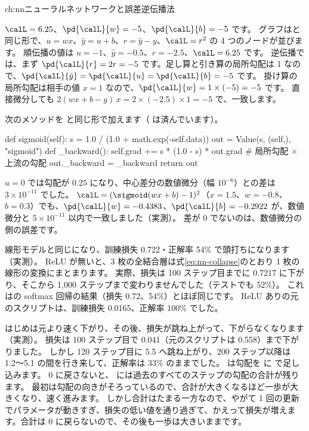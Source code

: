 \begin{answers}{ch:nn}{ニューラルネットワークと誤差逆伝播法}
\item $\calL=6.25$、$\pd{\calL}{w}=-5$、$\pd{\calL}{b}=-5$ です。
グラフはと同じ形で、$u=wx$、$\hat y=u+b$、$r=\hat y-y$、$\calL=r^2$ の 4 つのノードが並びます。
順伝播の値は $u=-1$、$\hat y=-0.5$、$r=-2.5$、$\calL=6.25$ です。
逆伝播では、まず $\pd{\calL}{r}=2r=-5$ です。足し算と引き算の局所勾配は 1 なので、$\pd{\calL}{\hat y}=\pd{\calL}{u}=\pd{\calL}{b}=-5$ です。
掛け算の局所勾配は相手の値 $x=1$ なので、$\pd{\calL}{w}=1\times(-5)=-5$ です。
直接微分しても $2(wx+b-y)\,x=2\times(-2.5)\times 1=-5$ で、一致します。

\item 次のメソッドを  と同じ形で加えます（ は済んでいます）。
\begin{pycode}
def sigmoid(self):
    s = 1.0 / (1.0 + math.exp(-self.data))
    out = Value(s, (self,), "sigmoid")
    def _backward():
        self.grad += s * (1.0 - s) * out.grad  # 局所勾配 × 上流の勾配
    out._backward = _backward
    return out
\end{pycode}
$u=0$ では勾配が $0.25$ になり、中心差分の数値微分（幅 $10^{-6}$）との差は $3\times10^{-11}$ でした。
$\calL=(\sigmoid(wx+b)-1)^2$（$x=1.5$、$w=-0.8$、$b=0.3$）でも、$\pd{\calL}{w}=-0.4383$、$\pd{\calL}{b}=-0.2922$ が、数値微分と $5\times10^{-11}$ 以内で一致しました（実測）。
差が 0 でないのは、数値微分の側の誤差です。

\item 線形モデルと同じになり、訓練損失 0.722・正解率 54\% で頭打ちになります（実測）。
ReLU が無いと、3 枚の全結合層は式\eqref{eq:nn-collapse}のとおり 1 枚の線形の変換にまとまります。
実際、損失は 100 ステップ目までに 0.7217 に下がり、そこから 1,000 ステップまで変わりませんでした（テストでも 52\%）。
これはの softmax 回帰の結果（損失 0.72、54\%）とほぼ同じです。
ReLU ありの元のスクリプトは、訓練損失 0.0165、正解率 100\% でした。

\item はじめは元より速く下がり、その後、損失が跳ね上がって、下がらなくなります（実測）。
損失は 100 ステップ目で 0.041（元のスクリプトは 0.558）まで下がりました。
しかし 120 ステップ目に 5.5 へ跳ね上がり、200 ステップ以降は 1.2〜5.1 の間を行き来して、正解率は 33\% のままでした。
 は勾配を  に \code{+=} で足し込みます。
0 に戻さないと、 には過去のすべてのステップの勾配の合計が残ります。
最初は勾配の向きがそろっているので、合計が大きくなるほど一歩が大きくなり、速く進みます。
しかし合計はたまる一方なので、やがて 1 回の更新でパラメータが動きすぎ、損失の低い値を通り過ぎて、かえって損失が増えます。合計は 0 に戻らないので、その後も一歩は大きいままです。


\end{answers}
